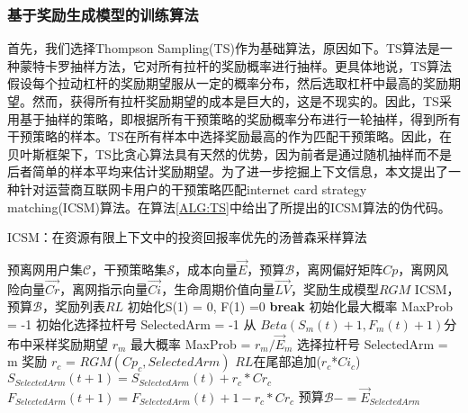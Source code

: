\subsubsection{基于奖励生成模型的训练算法}
	首先，我们选择Thompson Sampling(TS)作为基础算法，原因如下。TS算法是一种蒙特卡罗抽样方法，它对所有拉杆的奖励概率进行抽样。更具体地说，TS算法假设每个拉动杠杆的奖励期望服从一定的概率分布，然后选取杠杆中最高的奖励期望。然而，获得所有拉杆奖励期望的成本是巨大的，这是不现实的。因此，TS采用基于抽样的策略，即根据所有干预策略的奖励概率分布进行一轮抽样，得到所有干预策略的样本。TS在所有样本中选择奖励最高的作为匹配干预策略。因此，在贝叶斯框架下，TS比贪心算法具有天然的优势，因为前者是通过随机抽样而不是后者简单的样本平均来估计奖励期望。为了进一步挖掘上下文信息，本文提出了一种针对运营商互联网卡用户的干预策略匹配internet card strategy matching(ICSM)算法。在算法\ref{ALG:TS}中给出了所提出的ICSM算法的伪代码。
	
\begin{algorithm}
	\caption{ICSM：在资源有限上下文中的投资回报率优先的汤普森采样算法}
	\label{ALG:TS}
	\renewcommand{\algorithmicrequire}{\textbf{Input:}}
	\renewcommand{\algorithmicensure}{\textbf{Output:}}
	
	\begin{algorithmic}[1]
		\REQUIRE 预离网用户集$\mathcal{C}$，干预策略集$\mathcal{S}$，成本向量$\vec{E}$，预算$\mathcal{B}$，离网偏好矩阵$Cp$，离网风险向量$\vec{Cr}$，离网指示向量$\vec{Ci}$，生命周期价值向量$\vec{LV}$，奖励生成模型${RGM}$
		\ENSURE ICSM，预算$\mathcal{B}$，奖励列表$RL$
		\STATE 初始化S(1) = 0, F(1) =0
		\STATE \textbf{break}
		\ELSE
		\STATE 初始化最大概率 MaxProb = -1
		\STATE 初始化选择拉杆号 SelectedArm = -1			
		\STATE 从 $Beta(S_{m}(t)+1, F_{m}(t)+1)$分布中采样奖励期望 $r_{m}$
		\STATE 最大概率 MaxProb = $r_{m} / \vec{E}_{m}$
		\STATE 选择拉杆号 SelectedArm = m
		\ENDIF
		\ENDFOR
		\STATE 奖励 $r_c$ = $RGM(Cp_{c}, SelectedArm)$
		\STATE $RL$在尾部追加($r_c$*$Ci_{c}$) %
		\STATE $S_{SelectedArm}(t+1) = S_{SelectedArm}(t) + r_c*Cr_{c}$ 
		\STATE $F_{SelectedArm}(t+1) = F_{SelectedArm}(t) + 1 - r_c*Cr_{c}$ 
		\STATE 预算$\mathcal{B} -= \vec{E}_{SelectedArm}$
		
		\ENDIF		
		\ENDFOR
		
	\end{algorithmic}
\end{algorithm}



